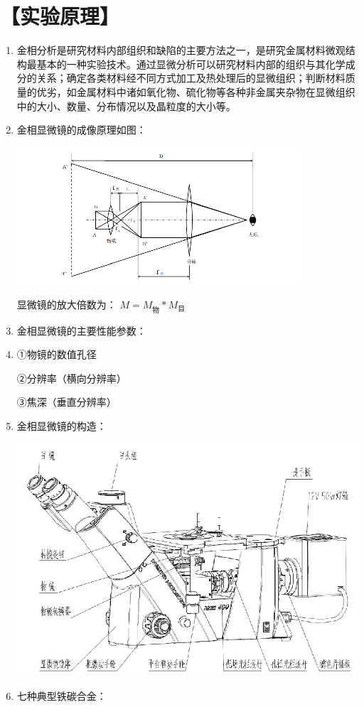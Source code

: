 \documentclass[a4paper,utf8]{article}
\begin{document}
\section*{【实验原理】}%
    \begin{enumerate}
        \item 金相分析是研究材料内部组织和缺陷的主要方法之一，是研究金属材料微观结构最基本的一种实验技术。通过显微分析可以研究材料内部的组织与其化学成分的关系；确定各类材料经不同方式加工及热处理后的显微组织；判断材料质量的优劣，如金属材料中诸如氧化物、硫化物等各种非金属夹杂物在显微组织中的大小、数量、分布情况以及晶粒度的大小等。
        \item 金相显微镜的成像原理如图：
        
        \begin{center}
            \includegraphics[width=300pt]{1.png}
        \end{center}
        
        显微镜的放大倍数为：
                       $M = M_\text{物} * M_\text{目}$
        \item 金相显微镜的主要性能参数：
        \item 
        ①物镜的数值孔径
        
        ②分辨率（横向分辨率）

        ③焦深（垂直分辨率）
        \item 金相显微镜的构造：
        \begin{center}
            \includegraphics[width=400pt]{2.png} 
        \end{center}
        \item 七种典型铁碳合金：


\end{enumerate}
\end{document}
